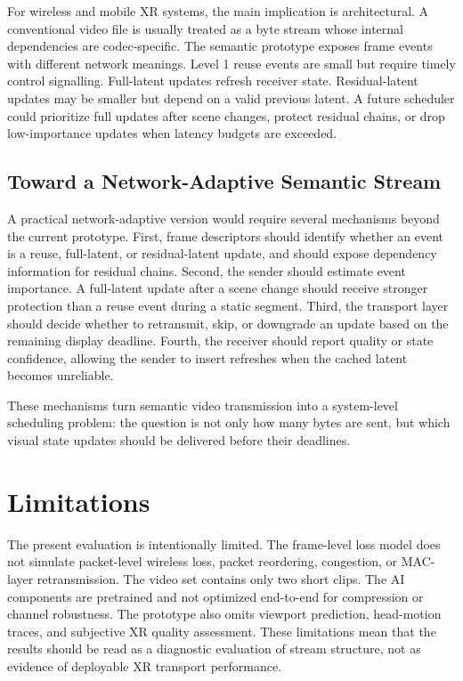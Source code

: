\documentclass[conference]{IEEEtran}
\begin{document}
For wireless and mobile XR systems, the main implication is architectural. A conventional video file is usually treated as a byte stream whose internal dependencies are codec-specific. The semantic prototype exposes frame events with different network meanings. Level 1 reuse events are small but require timely control signalling. Full-latent updates refresh receiver state. Residual-latent updates may be smaller but depend on a valid previous latent. A future scheduler could prioritize full updates after scene changes, protect residual chains, or drop low-importance updates when latency budgets are exceeded.

\subsection{Toward a Network-Adaptive Semantic Stream}

A practical network-adaptive version would require several mechanisms beyond the current prototype. First, frame descriptors should identify whether an event is a reuse, full-latent, or residual-latent update, and should expose dependency information for residual chains. Second, the sender should estimate event importance. A full-latent update after a scene change should receive stronger protection than a reuse event during a static segment. Third, the transport layer should decide whether to retransmit, skip, or downgrade an update based on the remaining display deadline. Fourth, the receiver should report quality or state confidence, allowing the sender to insert refreshes when the cached latent becomes unreliable.

These mechanisms 
turn semantic video transmission into a system-level scheduling problem: the question is not only how many bytes are sent, but which visual state updates should be delivered before their deadlines.


\section{Limitations}

The present evaluation is intentionally limited. The frame-level loss model does not simulate packet-level wireless loss, packet reordering, congestion, or MAC-layer retransmission. The video set contains only two short clips. The AI components are pretrained and not optimized end-to-end for compression or channel robustness. The prototype also omits viewport prediction, head-motion traces, and subjective XR quality assessment. These limitations mean that the results should be read as a diagnostic evaluation of stream structure, not as evidence of deployable XR transport performance.
\end{document}
